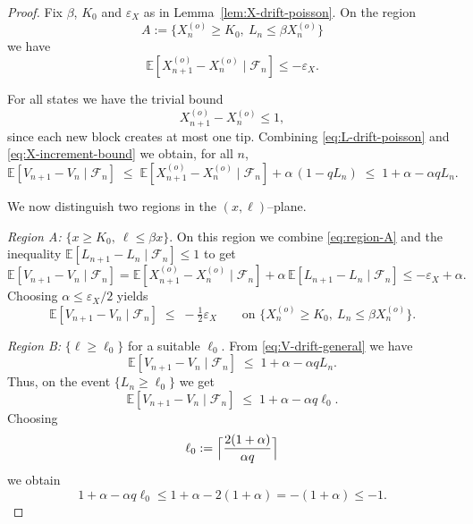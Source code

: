 \documentclass[a4paper,12pt,oneside,reqno]{amsart}
\newcommand{\E}{{\mathbb E}}
\newcommand{\F}{{\mathcal F}}
\newcommand{\1}{{\mathbf 1}}
\begin{document}
\begin{proof}
Fix $\beta$, $K_0$ and $\varepsilon_X$ as in Lemma~\ref{lem:X-drift-poisson}. On the region
\[
   A:=\{X_n^{(o)}\ge K_0,\ L_n\le\beta X_n^{(o)}\}
\]
we have
\begin{equation}\label{eq:region-A}
   \E[X_{n+1}^{(o)}-X_n^{(o)}\mid\F_n] \le -\varepsilon_X.
\end{equation}

For all states we have the trivial bound
\begin{equation}\label{eq:X-increment-bound}
   X_{n+1}^{(o)}-X_n^{(o)} \le 1,
\end{equation}
since each new block creates at most one tip. Combining \eqref{eq:L-drift-poisson} and \eqref{eq:X-increment-bound} we obtain, for all $n$,
\begin{equation}\label{eq:V-drift-general}
   \E[V_{n+1}-V_n \mid \F_n]
   \;\le\; \E[X_{n+1}^{(o)}-X_n^{(o)}\mid\F_n] + \alpha\,(1-qL_n)
   \;\le\; 1 + \alpha - \alpha q L_n.
\end{equation}

We now distinguish two regions in the $(x,\ell)$--plane.

\smallskip
\noindent\emph{Region A:} $\{x\ge K_0,\ \ell\le\beta x\}$. On this region we combine \eqref{eq:region-A} and the inequality $\E[L_{n+1}-L_n\mid\F_n]\le 1$ to get
\[
   \E[V_{n+1}-V_n\mid\F_n]
   = \E[X_{n+1}^{(o)}-X_n^{(o)}\mid\F_n]
     + \alpha\,\E[L_{n+1}-L_n\mid\F_n]
   \le -\varepsilon_X + \alpha.
\]
Choosing $\alpha\le \varepsilon_X/2$ yields
\begin{equation}\label{eq:V-drift-A}
   \E[V_{n+1}-V_n\mid\F_n]
   \;\le\; -\tfrac12\varepsilon_X
   \qquad\text{on }\{X_n^{(o)}\ge K_0,\ L_n\le\beta X_n^{(o)}\}.
\end{equation}

\smallskip
\noindent\emph{Region B:} $\{\ell\ge \ell_0\}$ for a suitable $\ell_0$. From \eqref{eq:V-drift-general} we have
\[
   \E[V_{n+1}-V_n\mid\F_n]
   \;\le\; 1+\alpha - \alpha q L_n.
\]
Thus, on the event $\{L_n\ge \ell_0\}$ we get
\begin{equation}\label{eq:V-drift-B}
   \E[V_{n+1}-V_n\mid\F_n]
   \;\le\; 1+\alpha - \alpha q \ell_0.
\end{equation}
Choosing
\[
   \ell_0 := \Bigl\lceil \frac{2(1+\alpha)}{\alpha q}\Bigr\rceil
\]
we obtain
\[
   1+\alpha - \alpha q \ell_0 \le 1+\alpha - 2(1+\alpha) = - (1+\alpha) \le -1.
\]


\end{proof}
\end{document}
